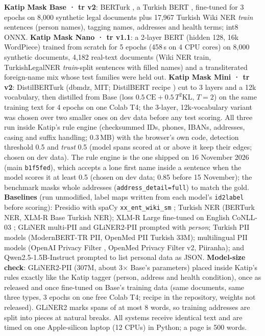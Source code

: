 \documentclass[10pt,twocolumn]{article}
\begin{document}
\textbf{Katip Mask Base · tr v2}: BERTurk \citep{schweter2020berturk}, a Turkish BERT \citep{devlin2019bert}, fine-tuned for 3 epochs on 8,000 synthetic
legal documents plus 17,967 Turkish Wiki NER \emph{train} sentences (person names), tagging names, addresses and
health terms; int8 ONNX. \textbf{Katip Mask Nano · tr v1.1}: a 2-layer BERT (hidden 128, 16k WordPiece) trained from
scratch for 5 epochs (458\,s on 4 CPU cores) on 8,000 synthetic documents, 4,182 real-text documents (Wiki NER
train, TurkishLegalNER \emph{train}-split sentences with filled names) and a transliterated foreign-name mix whose
test families were held out. \textbf{Katip Mask Mini · tr v2}: DistilBERTurk (dbmdz, MIT; DistilBERT recipe \citep{sanh2019distilbert}) cut to 3 layers
and a 12k vocabulary, then distilled from Base \citep{hinton2015distilling} (loss $0.5\,\mathrm{CE}+0.5\,T^2\mathrm{KL}$, $T=2$) on the same
training text for 4 epochs on one Colab T4; the 3-layer, 12k-vocabulary variant was chosen over two smaller ones on
dev data before any test scoring. All three run inside Katip's rule engine (checksummed IDs, phones, IBANs, addresses,
casing and suffix handling; 0.3\,MB) with the browser's own code, detection threshold 0.5 and \emph{trust} 0.5
(model spans scored at or above it keep their edges; chosen on dev data). The rule engine is the one shipped
on 16 November 2026 (main \texttt{b1f5fed}), which accepts a lone first name inside a sentence when the model scores it at
least 0.5 (chosen on dev data; 0.85 before 15 November); the benchmark masks whole addresses (\texttt{address\_detail=full}) to match the gold. \textbf{Baselines} (run unmodified, label maps written from each model's \texttt{id2label} before scoring):
Presidio with spaCy \texttt{xx\_ent\_wiki\_sm} \citep{presidio}; Turkish NER (BERTurk NER, XLM-R Base Turkish NER);
XLM-R Large fine-tuned on English CoNLL-03 \citep{conneau2020xlmr}; GLiNER multi-PII \citep{zaratiana2024gliner}
and GLiNER2-PII \citep{zaratiana2025gliner2,zaratiana2026gliner2pii} prompted with \emph{person}; Turkish PII models (ModernBERT-TR PII,
OpenMed PII Turkish 33M); multilingual PII models (OpenAI Privacy Filter \citep{openai-pf}, OpenMed Privacy Filter
v2, Piiranha); and Qwen2.5-1.5B-Instruct \citep{qwen2025} prompted to list personal data as JSON. \textbf{Model-size check}: GLiNER2-PII (307M,
about 3$\times$ Base's parameters) placed inside Katip's rules exactly like the Katip tagger (person, address and health condition), once as
released and once fine-tuned on Base's training data (same documents, same three types, 3 epochs on one free Colab T4; recipe in the
repository, weights not released). GLiNER2 marks spans of at most 8 words, so training addresses are split into pieces at natural breaks. All systems
receive identical text and are timed on one Apple-silicon laptop (12 CPUs) in Python; a page is 500 words.
\end{document}
